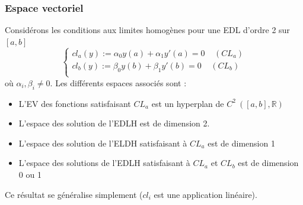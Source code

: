 \documentclass	[11pt, a4paper, openany]{book}
\begin{document}
			\subsubsection{Espace vectoriel}
			Considérons les conditions aux limites homogènes pour une EDL d'ordre 2 sur $[a,b]$
			\begin{equation}
				\left\{\begin{array}{l}
				cl_a(y) := \alpha_0y(a) + \alpha_1y'(a) = 0\ \ \ \ \ (CL_a)\\
				cl_b(y) := \beta_0y(b) + \beta_1y'(b) = 0\ \ \ \ \ (CL_b)\\
				\end{array}\right.
			\end{equation}
			où $\alpha_i,\beta_i \neq 0$. Les différents espaces associés sont :
			\begin{itemize}
				\item L'EV des fonctions satisfaisant $CL_a$ est un hyperplan de $C^2\ ([a,b], \mathbb{R})$
				\item L'espace des solution de l'EDLH est de dimension 2.
				\item L'espace des solution de l'ELDH satisfaisant à $CL_a$ est de dimension 1
				\item L'espace des solutions de l'EDLH satisfaisant à $CL_a$ et $CL_b$ est de dimension 0 ou 1
			\end{itemize}
			Ce résultat se généralise simplement ($cl_i$ est une application linéaire).
			
\end{document}
